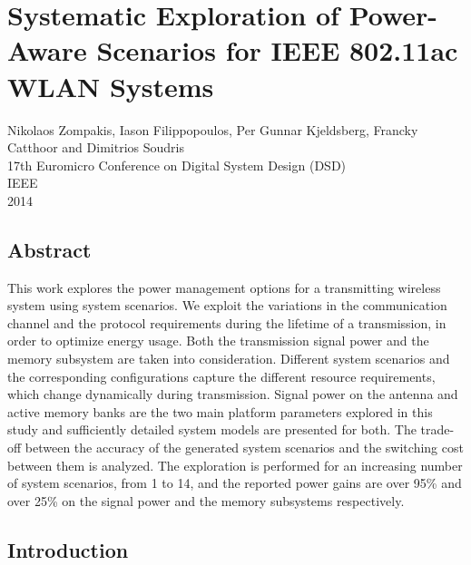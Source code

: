 \chapter{Systematic Exploration of Power-Aware Scenarios for IEEE 802.11ac WLAN Systems}

\begin{center}
Nikolaos Zompakis, Iason Filippopoulos, Per Gunnar Kjeldsberg, Francky Catthoor and Dimitrios Soudris
\\
17th Euromicro Conference on Digital System Design (DSD) 
\\
IEEE
\\
2014
\end{center}
\afterpage{\null\newpage}
\newpage

\vspace*{\fill}
\section*{\hspace*{\fill} Abstract \hspace*{\fill}}
This work explores the power management options for a transmitting wireless system using system scenarios. We exploit the variations in the communication channel and the protocol requirements during the lifetime of a transmission, in order to optimize energy usage. Both the transmission signal power and the memory subsystem are taken into consideration. Different system scenarios and the corresponding configurations capture the different resource requirements, which change dynamically during transmission. Signal power on the antenna and active memory banks are the two main platform parameters explored in this study and sufficiently detailed system models are presented for both. The trade-off between the accuracy of the generated system scenarios and the switching cost between them is analyzed. The exploration is performed for an increasing number of system scenarios, from 1 to 14, and the reported power gains are over 95\% and over 25\% on the signal power and the memory subsystems respectively.
\vspace*{\fill}
\afterpage{\null\newpage}
\newpage

\section{Introduction}

